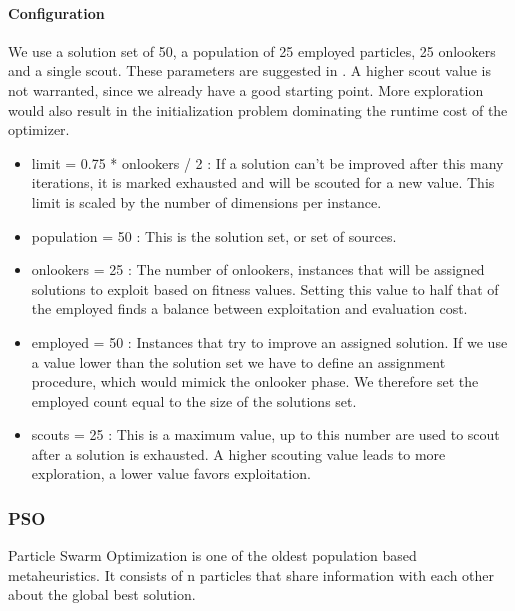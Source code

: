 \paragraph{Configuration}
We use a solution set of 50, a population of 25 employed particles, 25 onlookers and a single scout. These parameters are suggested in \citep{ABC}. A higher scout value is not warranted, since we already have a good starting point. More exploration would also result in the initialization problem dominating the runtime cost of the optimizer. 
\begin{itemize}
\item limit = 0.75 * onlookers / 2 : If a solution can't be improved after this many iterations, it is marked exhausted and will be scouted for a new value. This limit is scaled by the number of dimensions per instance. 
\item population = 50 : This is the solution set, or set of sources.
\item onlookers = 25 : The number of onlookers, instances that will be assigned solutions to exploit based on fitness values. Setting this value to half that of the employed finds a balance between exploitation and evaluation cost.
\item employed = 50 : Instances that try to improve an assigned solution. If we use a value lower than the solution set we have to define an assignment procedure, which would mimick the onlooker phase. We therefore set the employed count equal to the size of the solutions set. 
\item scouts = 25 : This is a maximum value, up to this number are used to scout after a solution is exhausted. A higher scouting value leads to more exploration, a lower value favors exploitation.
\end{itemize}

\subsubsection{PSO}
Particle Swarm Optimization \cite{PSO} is one of the oldest population based metaheuristics. It consists of n particles that share information with each other about the global best solution.

